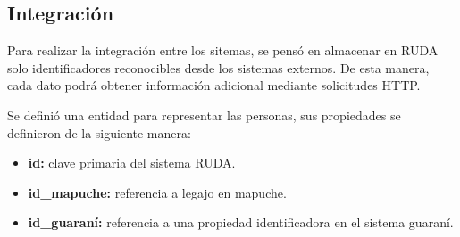 \subsection{Integración}
Para realizar la integración entre los sitemas, se pensó en almacenar en RUDA solo identificadores reconocibles desde los sistemas externos\@. De esta manera, cada dato podrá
obtener información adicional mediante solicitudes HTTP.


Se definió una entidad para representar las personas, sus propiedades se definieron de la siguiente manera:

\begin{itemize}
    \item \textbf{id:} clave primaria del sistema RUDA.
    \item \textbf{id\_mapuche:} referencia a legajo en mapuche.
    \item \textbf{id\_guaraní:} referencia a una propiedad identificadora en el sistema guaraní.
\end{itemize}

